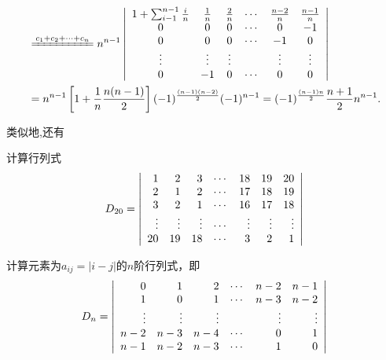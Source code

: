 \begin{frame}
  $$
  \begin{aligned}
    &  \xlongequal{c_1+c_2+\cd+c_n} 
    n^{n-1} \left|
      \begin{array}{cccccc}
        1+\sum_{i-1}^{n-1}\frac in   &  \frac 1n & \frac 2n & \cd &  \frac{n-2}n & \frac{n-1}n\\
        0   &  0 &  0 & \cd &   0  & -1 \\
        0   &  0 &  0 & \cd &  -1  & 0\\
        \vd & \vd & \vd&     & \vd  & \vd \\
        0   & -1 &  0 & \cd &   0   & 0
      \end{array}       
    \right|\\
    &  = n^{n-1} \left[ 1 + \frac 1n \frac {n(n-1)}2\right] 
    (-1)^{\frac{(n-1)(n-2)}2}(-1)^{n-1} = (-1)^{\frac{(n-1)n}2} \frac{n+1}2 n^{n-1}.
  \end{aligned}
  $$
\end{frame}

\begin{frame}
  类似地,还有
  \begin{li}
    计算行列式
    $$
    D_{20} = \left|
      \begin{array}{rrrrrrr}
        1   & 2    & 3    & \cdots  & 18    & 19    &  20 \\ 
        2   & 1    & 2    & \cdots  & 17    & 18    &  19 \\
        3   & 2    & 1    & \cdots  & 16    & 17    &  18 \\
        \vdots & \vdots  & \vdots  & \cdots  & \vdots   & \vdots   &  \vdots \\
        20  & 19   & 18   & \cdots  & 3     & 2     &  1
      \end{array}
    \right|
    $$    
  \end{li}

  \begin{li}
    计算元素为$a_{ij}=|i-j|$的$n$阶行列式，即
    $$
    D_{n}   =   \left|
      \begin{array}{rrrrrrr}
        0   & 1   & 2    & \cdots & n-2  & n-1 \\ 
        1   & 0   & 1    & \cdots & n-3  & n-2 \\
        \vdots & \vdots & \vdots  &     & \vdots  & \vdots \\
        n-2 & n-3 & n-4  & \cdots & 0     & 1 \\
        n-1 & n-2 & n-3  & \cdots & 1  & 0 
      \end{array}
    \right|
    $$
    
  \end{li}

\end{frame}

